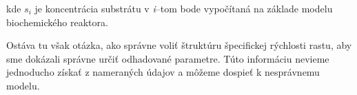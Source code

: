 kde $ s_{i} $ je koncentrácia substrátu v \textit{i}--tom bode vypočítaná na základe modelu biochemického reaktora.

Ostáva tu však otázka, ako správne voliť štruktúru špecifickej rýchlosti rastu, aby sme dokázali správne určiť odhadované parametre. Túto informáciu nevieme jednoducho získať z nameraných údajov a môžeme dospieť k nesprávnemu modelu.
